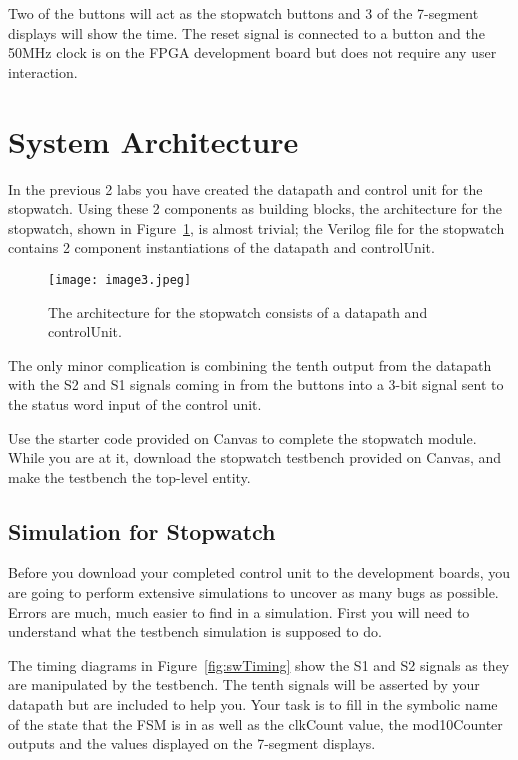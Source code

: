 Two of the buttons will act as the stopwatch buttons
and 3 of the 7-segment displays will show the time. The reset signal is
connected to a button and the 50MHz clock is on the FPGA
development board but does not require any user
interaction.

\section{System Architecture}

In the previous 2 labs you have created the datapath and control unit
for the stopwatch. Using these 2 components as building blocks, the
architecture for the stopwatch, shown in Figure~\ref{fig:swArch}, is almost trivial;
the Verilog file for the stopwatch contains 2 component instantiations
of the datapath and controlUnit.

\begin{figure}
\texttt{[image: image3.jpeg]}
\caption{The architecture for the stopwatch consists of a datapath and
controlUnit.}
\label{fig:swArch}
\end{figure}

The only minor complication is combining the tenth output from the
datapath with the S2 and S1 signals coming in from the
buttons into a 3-bit signal sent to the status word input of the control
unit.

Use the starter code provided on Canvas to complete the stopwatch
module. While you are at it, download the stopwatch testbench provided
on Canvas, and make the testbench the top-level entity.

\subsection{Simulation for Stopwatch}

Before you download your completed control unit to the development boards,
you are going to perform extensive simulations to uncover as many bugs
as possible. Errors are much, much easier to find in a simulation. First
you will need to understand what the testbench simulation is supposed to
do.

The timing diagrams in Figure~\ref{fig:swTiming} show the S1 and S2 signals
as they are manipulated by the testbench. The tenth signals will be
asserted by your datapath but are included to help you. Your task is to
fill in the symbolic name of the state that the FSM is in as well as the
clkCount value, the mod10Counter outputs and the values displayed on the
7-segment displays.

